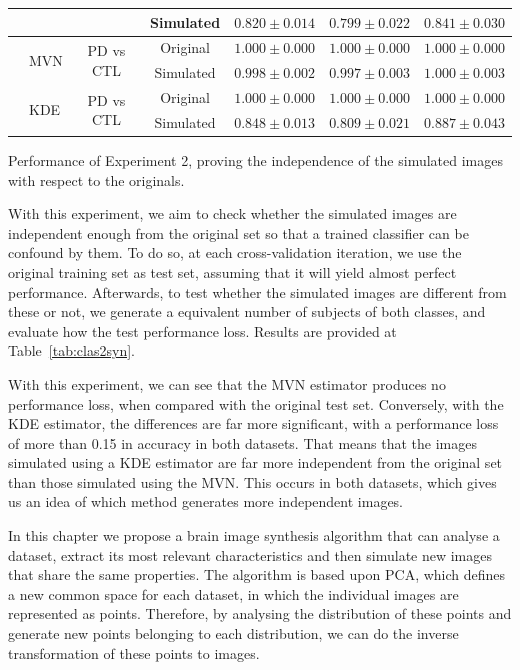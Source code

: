 \begin{bigtable}
\begin{tabular}{llccccc}
		& & & Simulated & $0.820 \pm 0.014 $ & $0.799 \pm 0.022 $ & $0.841 \pm 0.030 $\\ 
		\midrule
		\multirow{4}{*}{\ppmidat{}} & \multirow{2}{*}{\ac{MVN}} & \multirow{2}{*}{\ac{PD} vs \ac{CTL}} & Original & $1.000 \pm 0.000 $ & $1.000 \pm 0.000 $ & $1.000 \pm 0.000 $\\
		& & &  Simulated & $0.998 \pm 0.002 $ & $0.997 \pm 0.003$ & $1.000 \pm 0.003$\\  \cline{2-7}
		& \multirow{2}{*}{\ac{KDE}} & \multirow{2}{*}{\ac{PD} vs \ac{CTL}} & Original & $1.000 \pm 0.000 $ & $1.000 \pm 0.000 $ & $1.000 \pm 0.000 $\\
		& & &  Simulated & $0.848 \pm 0.013 $ & $0.809 \pm 0.021$ & $0.887 \pm 0.043$\\ 
		\bottomrule 
	\end{tabular}
	\vspace{1em}
	\caption{Performance of Experiment 2, proving the independence of the simulated images with respect to the originals.}
	\label{tab:clas2syn}
\end{bigtable}

With this experiment, we aim to check whether the simulated images are independent enough from the original set so that a trained classifier can be confound by them. To do so, at each cross-validation iteration, we use the original training set as test set, assuming that it will yield almost perfect performance. Afterwards, to test whether the simulated images are different from these or not, we generate a equivalent number of subjects of both classes, and evaluate how the test performance loss. Results are provided at Table~\ref{tab:clas2syn}. 

With this experiment, we can see that the \ac{MVN} estimator produces no performance loss, when compared with the original test set. Conversely, with the \ac{KDE} estimator, the differences are far more significant, with a performance loss of more than 0.15 in accuracy in both datasets. That means that the images simulated using a \ac{KDE} estimator are far more independent from the original set than those simulated using the \ac{MVN}. This occurs in both datasets, which gives us an idea of which method generates more independent images. 

In this chapter we propose a brain image synthesis algorithm that can analyse a dataset, extract its most relevant characteristics and then simulate new images that share the same properties. The algorithm is based upon \ac{PCA}, which defines a new common space for each dataset, in which the individual images are represented as points. Therefore, by analysing the distribution of these points and generate new points belonging to each distribution, we can do the inverse transformation of these points to images. 

